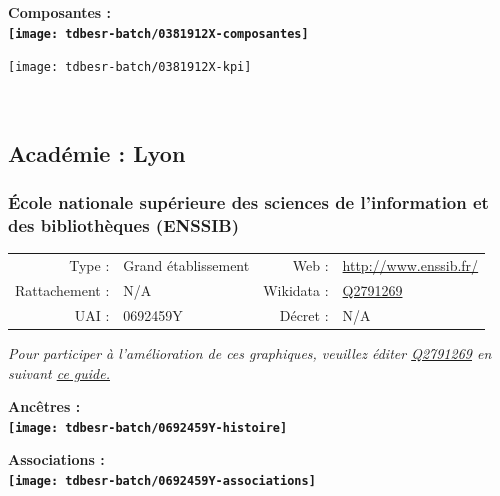 \documentclass[12pt,french,]{article}
\begin{document}
\hrulefill

\begin{center} \bf Composantes : \\  
\texttt{[image: tdbesr-batch/0381912X-composantes]} \end{center}

\begin{center}\texttt{[image: tdbesr-batch/0381912X-kpi]} \end{center}\checkoddpage

\ifoddpage \fi ~\newpage  

\hypertarget{acaduxe9mie-lyon-1}{%
\subsection{Académie : Lyon}\label{acaduxe9mie-lyon-1}}

\hypertarget{uxe9cole-nationale-supuxe9rieure-des-sciences-de-linformation-et-des-bibliothuxe8ques-enssib}{%
\subsubsection{École nationale supérieure des sciences de l'information
et des bibliothèques
(ENSSIB)}\label{uxe9cole-nationale-supuxe9rieure-des-sciences-de-linformation-et-des-bibliothuxe8ques-enssib}}

\begin{tabular*}{\textwidth}{rp{5cm}rl}  
\hline  
Type : & Grand établissement & Web : &\href{http://www.enssib.fr/}{http://www.enssib.fr/} \\  
Rattachement : & N/A & Wikidata : & \href{https://www.wikidata.org/entity/Q2791269}{Q2791269} \\  
UAI : & 0692459Y & Décret : & N/A \\  
\hline  
\end{tabular*}

\textit{\scriptsize Pour participer à l'amélioration de ces graphiques, veuillez éditer  \href{https://www.wikidata.org/entity/Q2791269}{Q2791269}  en suivant \href{https://github.com/cpesr/wikidataESR/blob/master/Rmd/wikidataESR.md}{ce guide.}}

\vspace{1cm}  
\begin{minipage}[b]{0.50\textwidth}\begin{center} \bf Ancêtres : \\  
\texttt{[image: tdbesr-batch/0692459Y-histoire]} \end{center}\end{minipage}\begin{minipage}[b]{0.50\textwidth}\begin{center} \bf Associations : \\  
\texttt{[image: tdbesr-batch/0692459Y-associations]} \end{center}\end{minipage}
\end{document}
